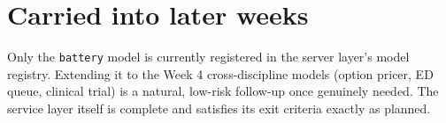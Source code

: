 \documentclass[11pt]{article}
\begin{document}
\section*{Carried into later weeks}
Only the \texttt{battery} model is currently registered in the server
layer's model registry. Extending it to the Week 4 cross-discipline
models (option pricer, ED queue, clinical trial) is a natural, low-risk
follow-up once genuinely needed. The service layer itself is complete
and satisfies its exit criteria exactly as planned.
\end{document}
